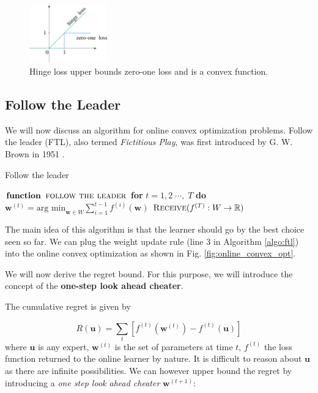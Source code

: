 \documentclass[11pt]{article}
\begin{document}
\begin{figure}[ht]
    \centering
    \includegraphics[width=0.3\textwidth]{hinge_loss.png}
    \caption{Hinge loss upper bounds zero-one loss and is a convex function.}
    \label{fig:hinge_loss}
\end{figure}


\subsection{Follow the Leader}
We will now discuss an algorithm for online convex optimization problems. Follow the leader (FTL), also termed \textit{Fictitious Play}, was first introduced by G. W. Brown in 1951 \cite{brown1951iterative,berger2007brown}.


\begin{algorithm}[H]
\caption{Follow the leader}
\label{algo:ftl}
\begin{algorithmic}[1]
\STATE $\textbf{function} \;\;\textsc{follow the leader} $
\STATE \qquad \textbf{for} {$t=1,2\;\cdots,\;T$} \textbf{do}
\vspace{5pt}
\STATE \qquad \qquad $\boldsymbol{w}^{(t)}=\text{arg min}_{\boldsymbol{w}\in W} \sum_{i=1}^{t-1} f^{(i)} (\boldsymbol{w})$
\vspace{5pt}
\STATE \qquad \qquad $\textsc{Receive}(f^{(T)}:W \rightarrow \mathbb{R})$
 \label{alg:wma_weight_update}
\end{algorithmic}
\end{algorithm}

The main idea of this algorithm is that the learner should go by the best choice seen so far. We can plug the weight update rule (line 3 in Algorithm \ref{algo:ftl}) into the online convex optimization as shown in Fig. \ref{fig:online_convex_opt}.

We will now derive the regret bound. For this purpose, we will introduce the concept of the \textbf{ one-step look ahead cheater}. 

The cumulative regret is given by

\begin{equation*}
    R(\boldsymbol{u})=\sum_t [f^{(t)}(\boldsymbol{w}^{(t)})-f^{(t)}(\boldsymbol{u})]
\end{equation*}
where $\boldsymbol{u}$ is any expert, $\boldsymbol{w}^{(t)}$ is the set of parameters at time $t$, $f^{(t)}$ the loss function returned to the online learner by nature. It is difficult to reason about $\boldsymbol{u}$ as there are infinite possibilities. We can however upper bound the regret by introducing a \textit{one step look ahead cheater} $\boldsymbol{w}^{(t+1)}$:
\end{document}
